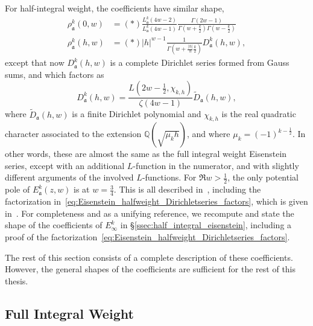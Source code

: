 For half-integral weight, the coefficients have similar shape,
\begin{equation}
  \begin{split}\label{eq:Eisenstein_halfweight_generalshape_coeffs}
    \rho_\mathfrak{a}^k(0, w) &= (*) \frac{L^k_\mathfrak{a}(4w-2)}{L^k_\mathfrak{a}(4w-1)}
    \frac{\Gamma(2w-1)}{\Gamma(w + \frac{k}{2}) \Gamma(w - \frac{k}{2})} \\
    \rho_\mathfrak{a}^k(h, w) &= (*) \lvert h \rvert^{w-1} \frac{1}{\Gamma(w +
    \frac{\lvert h \rvert}{h} \frac{k}{2})} D_\mathfrak{a}^k(h,w),
  \end{split}
\end{equation}
except that now $D_\mathfrak{a}^k(h,w)$ is a complete Dirichlet series formed from Gauss
sums, and which factors as
\begin{equation}\label{eq:Eisenstein_halfweight_Dirichletseries_factors}
  D_\mathfrak{a}^k(h,w) = \frac{L(2w - \frac{1}{2}, \chi_{k,h})}{\zeta(4w-1)}
  \widetilde{D}_\mathfrak{a}(h,w),
\end{equation}
where $\widetilde{D}_\mathfrak{a}(h,w)$ is a finite Dirichlet polynomial and $\chi_{k,h}$
is the real quadratic character associated to the extension $\mathbb{Q}(\sqrt{\mu_k h})$,
and where $\mu_k = (-1)^{k - \frac{1}{2}}$.
In other words, these are almost the same as the full integral weight Eisenstein series,
except with an additional $L$-function in the numerator, and with slightly different
arguments of the involved $L$-functions.
For $\Re w > \frac{1}{2}$, the only potential pole of $E_\mathfrak{a}^k(z,w)$ is at $w
= \frac{3}{4}$.
This is all described in~\cite{goldfeld1985eisenstein}, including the factorization
in~\eqref{eq:Eisenstein_halfweight_Dirichletseries_factors}, which is given
in~\cite[Corollary 1.3]{goldfeld1985eisenstein}.
For completeness and as a unifying reference, we recompute and state the shape of the
coefficients of $E_\infty^k$ in \S\ref{ssec:half_integral_eisenstein}, including a proof
of the factorization~\eqref{eq:Eisenstein_halfweight_Dirichletseries_factors}.


The rest of this section consists of a complete description of these coefficients.
However, the general shapes of the coefficients are sufficient for the rest of this
thesis.





\subsection{Full Integral Weight}\label{ssec:full_integral_eisenstein}


